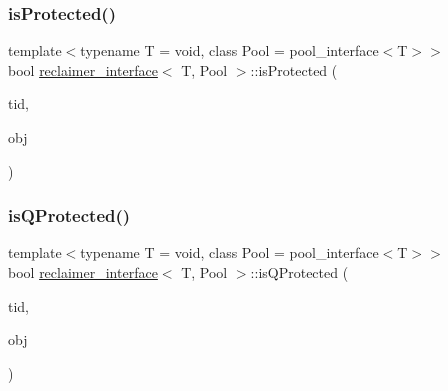 \mbox{\label{classreclaimer__interface_ad459569f628d48ad8f953de155277937}} 
\subsubsection{\texorpdfstring{is\+Protected()}{isProtected()}}
{\footnotesize\ttfamily template$<$typename T  = void, class Pool  = pool\+\_\+interface$<$\+T$>$$>$ \\
bool \hyperlink{classreclaimer__interface}{reclaimer\+\_\+interface}$<$ T, Pool $>$\+::is\+Protected (\begin{DoxyParamCaption}\item[{const int}]{tid,  }\item[{T $\ast$const}]{obj }\end{DoxyParamCaption})\hspace{0.3cm}{\ttfamily [inline]}}

\mbox{\label{classreclaimer__interface_adca271430185d90a3a1c7aea22d8bb0c}} 
\subsubsection{\texorpdfstring{is\+Q\+Protected()}{isQProtected()}}
{\footnotesize\ttfamily template$<$typename T  = void, class Pool  = pool\+\_\+interface$<$\+T$>$$>$ \\
bool \hyperlink{classreclaimer__interface}{reclaimer\+\_\+interface}$<$ T, Pool $>$\+::is\+Q\+Protected (\begin{DoxyParamCaption}\item[{const int}]{tid,  }\item[{T $\ast$const}]{obj }\end{DoxyParamCaption})\hspace{0.3cm}{\ttfamily [inline]}}

\mbox{\label{classreclaimer__interface_a8434d6efc52667ddd3c6738733c79db8}} 
